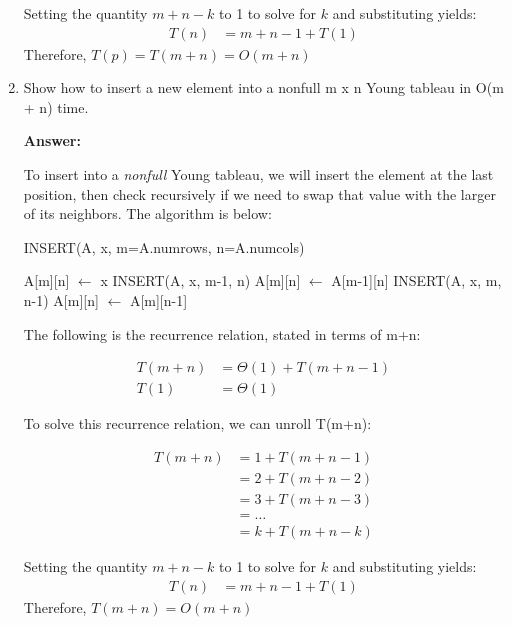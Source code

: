 \documentclass[]{book}
\theoremstyle{definition}
\begin{document}
\begin{enumerate}
    Setting the quantity $m+n-k$ to 1 to solve for $k$ and substituting yields:
    \begin{align*}
        T(n) &= m+n-1 + T(1)
    \end{align*}
    Therefore, $T(p) = T(m+n) = O(m+n)$

    \item Show how to insert a new element into a nonfull m x n Young tableau in O(m + n) time.

    \textbf{Answer:}

    To insert into a \textit{nonfull} Young tableau, we will insert the element at the last position,
    then check recursively if we need to swap that value with the larger of its neighbors.
    The algorithm is below:

    \begin{algorithm}[h]
    \caption{INSERT(A, x, m=A.numrows, n=A.numcols)}
    \begin{algorithmic}[1]
    \STATE A[m][n] $\leftarrow$ x
        \STATE INSERT(A, x, m-1, n)
        \STATE A[m][n] $\leftarrow$ A[m-1][n]
    \ENDIF
        \STATE INSERT(A, x, m, n-1)
        \STATE A[m][n] $\leftarrow$ A[m][n-1]
    \ENDIF
    \end{algorithmic}
    \end{algorithm}

    The following is the recurrence relation, stated in terms of m+n:

    \begin{align*}
        T(m+n) &= \Theta(1) + T(m+n-1) \\
        T(1) &= \Theta(1)
    \end{align*}

    To solve this recurrence relation, we can unroll T(m+n):

    \begin{align*}
        T(m+n) &= 1 + T(m+n-1) \\
               &= 2 + T(m+n-2) \\
               &= 3 + T(m+n-3) \\
               &= \dots \\
               &= k + T(m+n-k)
    \end{align*}

    Setting the quantity $m+n-k$ to 1 to solve for $k$ and substituting yields:
    \begin{align*}
        T(n) &= m+n-1 + T(1)
    \end{align*}
    Therefore, $T(m+n) = O(m+n)$
    

\end{enumerate}
\end{document}

